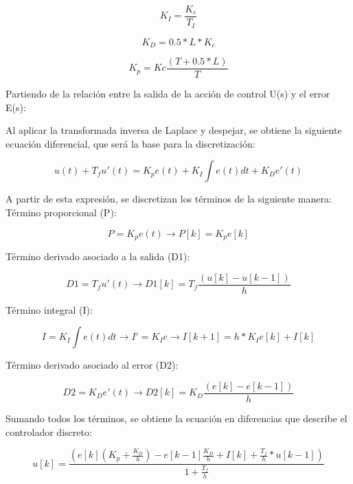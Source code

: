 \documentclass[letterpaper, 10 pt, conference]{ieeeconf}  %
\begin{document}
\begin{equation*}
  K_{I} = \frac{K_c}{T_I}
\end{equation*}

\begin{equation*}
  K_D = 0.5*L*K_{c}
\end{equation*}

\begin{equation*}
  K_p = Kc\frac{(T + 0.5*L)}{T}
\end{equation*}

Partiendo de la relación entre la salida de la acción de control U(s) y el error E(s):

Al aplicar la transformada inversa de Laplace y despejar, se obtiene la siguiente ecuación diferencial, que será la base para la discretización:

\begin{equation*}
  u(t) + T_{f} u'(t) = K_{p} e(t) + K_{I} \int e(t)dt + K_{D} e'(t)
\end{equation*}

A partir de esta expresión, se discretizan los términos de la siguiente manera:
Término proporcional (P):

\begin{equation*}
  P = K_{p} e(t) \rightarrow P[k] = K_{p} e[k]
\end{equation*}

Término derivado asociado a la salida (D1):

\begin{equation*}
  D1 = T_{f} u'(t) \rightarrow D1[k] = T_{f} \frac{( u[k] - u[k-1] )}{h}
\end{equation*}

Término integral (I):

\begin{equation*}
  I = K_{I} \int  e(t)dt \rightarrow I' = K_{I} e \rightarrow I[k+1] = h*K_{I}e[k] + I[k]
\end{equation*}

Término derivado asociado al error (D2):

\begin{equation*}
  D2 = K_{D} e'(t) \rightarrow D2[k] = K_{D} \frac{( e[k] - e[k-1] )}{h}
\end{equation*}

Sumando todos los términos, se obtiene la ecuación en diferencias que describe el controlador discreto:

\begin{equation*}
  u[k] = \frac{(e[k](K_{p} + \frac{K_{D}}{h}) - e[k-1]\frac{K_{D}}{h} + I[k] + \frac{T_{f}}{h} * u[k-1])}{1 + \frac{T_{f}}{h}}
\end{equation*}
\end{document}
